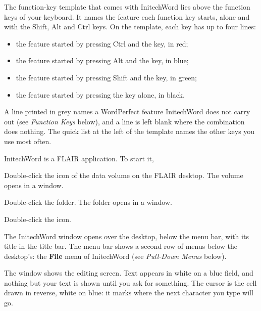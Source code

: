 The function-key template that comes with InitechWord lies above the
function keys of your keyboard.  It names the feature each function key
starts, alone and with the Shift, Alt and Ctrl keys.  On the template, each
key has up to four lines:
\begin{itemize}
\item the feature started by pressing Ctrl and the key, in red;
\item the feature started by pressing Alt and the key, in blue;
\item the feature started by pressing Shift and the key, in green;
\item the feature started by pressing the key alone, in black.
\end{itemize}
A line printed in grey names a WordPerfect feature InitechWord does not
carry out (see \textit{Function Keys} below), and a line is left blank where
the combination does nothing.  The quick list at the left of the template
names the other keys you use most often.

InitechWord is a FLAIR application.  To start it,
\begin{WPSteps}
\item Double-click the icon of the data volume on the FLAIR desktop.  The
volume opens in a window.
\item Double-click the  folder.  The folder opens in a window.
\item Double-click the  icon.
\end{WPSteps}
The InitechWord window opens over the desktop, below the menu bar, with
its title  in the title bar.  The menu bar shows a second
row of menus below the desktop's: the \textbf{File} menu of InitechWord
(see \textit{Pull-Down Menus} below).


The window shows the editing screen.  Text appears in white on a blue
field, and nothing but your text is shown until you ask for something.  The
cursor is the cell drawn in reverse, white on blue: it marks where the next
character you type will go.


